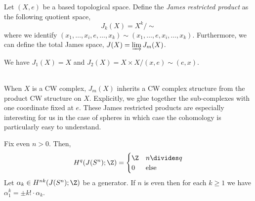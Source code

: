 \documentclass[12pt]{extarticle}
\begin{document}
\begin{defn}
Let $(X, e)$ be a based topological space. Define the \textit{James restricted product} as the following quotient space,
\[ J_k(X) = X^k / \sim \]
where we identify $(x_1, \dots, x_i, e, \dots, x_k) \sim (x_1, \dots, e, x_i, \dots, x_k)$. Furthermore, we can define the total James space, $J(X) = \varinjlim J_m(X)$. 
\end{defn}

\begin{example}
We have $J_1(X) = X$ and $J_2(X) = X \times X / (x, e) \sim (e, x)$. 
\end{example}
\noindent\\
When $X$ is a CW complex, $J_m(X)$ inherits a CW complex structure from the product CW structure on $X$. Explicitly, we glue together the sub-complexes with one coordinate fixed at $e$. These James restricted products are especially interesting for us in the case of spheres in which case the cohomology is particularly easy to understand.

\begin{theorem} \label{cup_relation}
Fix even $n > 0$. Then,
\[ H^q(J(S^n); \Z) = 
\begin{cases}
\Z & n \divides q
\\
0 & \text{else}
\end{cases} \]
Let $\alpha_k \in H^{nk}(J(S^n); \Z)$ be a generator. If $n$ is even then for each $k \ge 1$ we have $\alpha_1^k = \pm k! \cdot \alpha_k$. 
\end{theorem} 
\end{document}
